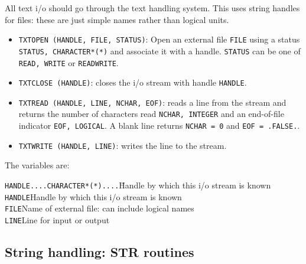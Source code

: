 All text i/o should go through the text handling system. This uses
string handles for files: these are just simple names rather than
logical units.
\begin{itemize}
\item {\tt TXTOPEN (HANDLE, FILE, STATUS)}: Open an external file {\tt FILE}
using a status {\tt STATUS, CHARACTER*(*)} and associate it with a handle.
{\tt STATUS} can be one of {\tt READ, WRITE} or {\tt READWRITE}.
\item {\tt TXTCLOSE (HANDLE)}: closes the i/o stream with handle {\tt HANDLE}.
\item {\tt TXTREAD (HANDLE, LINE, NCHAR, EOF)}: reads a line from the stream
and returns the number of characters read {\tt NCHAR, INTEGER} and 
an end-of-file indicator {\tt EOF, LOGICAL}. A blank line returns
{\tt NCHAR = 0} and {\tt EOF = .FALSE.}.
\item {\tt TXTWRITE (HANDLE, LINE)}: writes the line to the stream.
\end{itemize}
The variables are:
\begin{tabbing}
{\tt HANDLE....}\={\tt CHARACTER*(*)....}\=Handle by which this i/o stream is known\kill
{\tt HANDLE}\>Handle by which this i/o stream is known\\
{\tt FILE}\>Name of external file: can include logical names\\
{\tt LINE}\>Line for input or output
\end{tabbing}

\subsection{String handling: STR routines}


